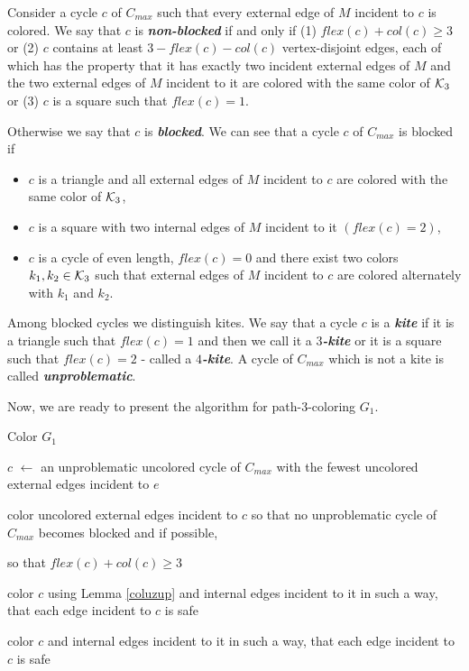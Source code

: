 \documentclass[a4, 11pt]{article}
\newcommand{\<}{\langle}
\renewcommand{\>}{\rangle}
\newcommand{\Kt}{{\cal K}_3}
\begin{document}
Consider a cycle $c$ of $C_{max}$ such that every external edge of $M$ incident to $c$ is colored. We say that $c$  is {\bf \em  non-blocked} if and only if (1)  $flex(c)+col(c) \geq 3$   or   (2)  $c$  contains at least $3 - flex(c)-col(c)$ vertex-disjoint edges, each of which has the property that it has exactly two incident external edges of $M$ and the two external edges of $M$  incident to it  are colored with the same color of $\Kt$ or (3) $c$ is a square such that $flex(c)=1$.

Otherwise we say that $c$ is {\bf \em blocked}.
We can see  that a cycle $c$ of $C_{max}$ is  blocked  if
\begin{itemize}
\item $c$ is a triangle and all external edges of $M$ incident to $c$ are colored with the same color of $\Kt$,
\item $c$ is a square with two internal edges of $M$ incident to it $(flex(c)=2)$,
\item $c$ is a cycle of even length, $flex(c)=0$   and  there exist two colors $k_1, k_2 \in \Kt$ such that external edges of $M$ incident to $c$ are colored alternately with $k_1$ and $k_2$.
\end{itemize}

Among blocked cycles we distinguish kites. We say that a cycle $c$ is a {\bf \em kite} if it is a triangle such that $flex(c)=1$ and then we call it a {\bf \em $3$-kite} or it is a square such that $flex(c)=2$ - called a {\bf \em $4$-kite}.
A cycle of $C_{max}$ which is not a kite is called {\bf \em unproblematic}.


Now, we are ready to present the algorithm for path-$3$-coloring $G_1$. \\



\begin{algorithm}
	\caption{Color $G_1$}
	\label{alg:col_g1}
	\begin{algorithmic}
	    \State $c$ $\gets$ an unproblematic uncolored cycle of $C_{max}$ with the fewest 
	    uncolored external edges incident to $e$

	    \State color uncolored external edges incident to $c$ so that no unproblematic cycle
	    of $C_{max}$ becomes blocked and if possible, 
			
			\State so that $flex(c) + col(c) \geq 3$

	    \State color $c$ using Lemma \ref{coluzup} and internal edges incident to it in such a way, that
	    each edge incident to $c$ is safe
	  \EndWhile

	    \State color $c$ and internal edges incident to it in such a way, that
	    each edge incident to $c$ is safe
	  \EndWhile
	\end{algorithmic}
\end{algorithm}
\end{document}
